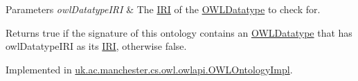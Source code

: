 \begin{DoxyParams}{Parameters}
{\em owl\-Datatype\-I\-R\-I} & The \hyperlink{classorg_1_1semanticweb_1_1owlapi_1_1model_1_1_i_r_i}{I\-R\-I} of the \hyperlink{interfaceorg_1_1semanticweb_1_1owlapi_1_1model_1_1_o_w_l_datatype}{O\-W\-L\-Datatype} to check for. \\
\hline
\end{DoxyParams}
\begin{DoxyReturn}{Returns}
{\ttfamily true} if the signature of this ontology contains an \hyperlink{interfaceorg_1_1semanticweb_1_1owlapi_1_1model_1_1_o_w_l_datatype}{O\-W\-L\-Datatype} that has {\ttfamily owl\-Datatype\-I\-R\-I} as its \hyperlink{classorg_1_1semanticweb_1_1owlapi_1_1model_1_1_i_r_i}{I\-R\-I}, otherwise {\ttfamily false}. 
\end{DoxyReturn}


Implemented in \hyperlink{classuk_1_1ac_1_1manchester_1_1cs_1_1owl_1_1owlapi_1_1_o_w_l_ontology_impl_ab1b23f08c1d76f401b217329405da2f7}{uk.\-ac.\-manchester.\-cs.\-owl.\-owlapi.\-O\-W\-L\-Ontology\-Impl}.

